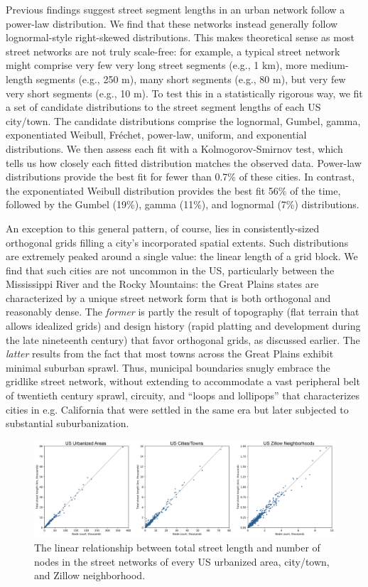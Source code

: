 \documentclass[11pt]{article}
\begin{document}
\begin{multicols}{2}
Previous findings \citep[e.g.,][]{masucci_random_2009} suggest street segment lengths in an urban network follow a power-law distribution. We find that these networks instead generally follow lognormal-style right-skewed distributions. This makes theoretical sense as most street networks are not truly scale-free: for example, a typical street network might comprise very few very long street segments (e.g., 1 km), more medium-length segments (e.g., 250 m), many short segments (e.g., 80 m), but very few very short segments (e.g., 10 m). To test this in a statistically rigorous way, we fit a set of candidate distributions to the street segment lengths of each US city/town. The candidate distributions comprise the lognormal, Gumbel, gamma, exponentiated Weibull, Fréchet, power-law, uniform, and exponential distributions. We then assess each fit with a Kolmogorov-Smirnov test, which tells us how closely each fitted distribution matches the observed data. Power-law distributions provide the best fit for fewer than 0.7\% of these cities. In contrast, the exponentiated Weibull distribution provides the best fit 56\% of the time, followed by the Gumbel (19\%), gamma (11\%), and lognormal (7\%) distributions.

An exception to this general pattern, of course, lies in consistently-sized orthogonal grids filling a city's incorporated spatial extents. Such distributions are extremely peaked around a single value: the linear length of a grid block. We find that such cities are not uncommon in the US, particularly between the Mississippi River and the Rocky Mountains: the Great Plains states are characterized by a unique street network form that is both orthogonal and reasonably dense. The \emph{former} is partly the result of topography (flat terrain that allows idealized grids) and design history (rapid platting and development during the late nineteenth century) that favor orthogonal grids, as discussed earlier. The \emph{latter} results from the fact that most towns across the Great Plains exhibit minimal suburban sprawl. Thus, municipal boundaries snugly embrace the gridlike street network, without extending to accommodate a vast peripheral belt of twentieth century sprawl, circuity, and \enquote{loops and lollipops} \citep{southworth_streets_1997} that characterizes cities in e.g. California that were settled in the same era but later subjected to substantial suburbanization.

\begin{figure}[htbp]
	\centering
	\includegraphics[width=1\textwidth]{fig03.png}
	\caption{The linear relationship between total street length and number of nodes in the street networks of every US urbanized area, city/town, and Zillow neighborhood.}
	\label{fig:fig03}
\end{figure}


\end{multicols}
\end{document}
